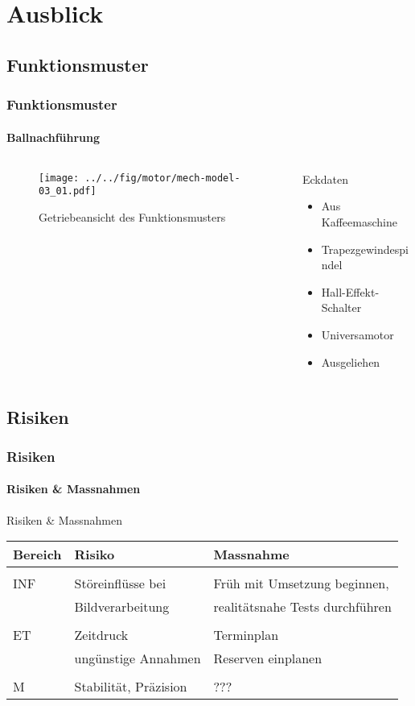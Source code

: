 \section{Ausblick}

\subsection{Funktionsmuster}
\begin{frame}
	\frametitle{Funktionsmuster\hfill{}\footnotesize \group}
	\framesubtitle{Ballnachführung}
	\begin{columns}
		\begin{column}{0.5\textwidth}
			\begin{figure}
				\texttt{[image: ../../fig/motor/mech-model-03\_01.pdf]}
				\caption{Getriebeansicht des Funktionsmusters}
			\end{figure}
		\end{column}
		\begin{column}{0.5\textwidth}
			\begin{block}{Eckdaten}
				\begin{itemize}
					\item Aus Kaffeemaschine
					\item Trapezgewindespindel
					\item Hall-Effekt-Schalter
					\item Universamotor
					\item Ausgeliehen
				\end{itemize}
			\end{block}
		\end{column}
	\end{columns}
\end{frame}

\subsection{Risiken}
\begin{frame}
	\frametitle{Risiken \hfill{} \footnotesize \group}
	\framesubtitle{Risiken \& Massnahmen}
	\begin{block}{Risiken \& Massnahmen}
		\begin{tabular}{l l l}
			Bereich
				& Risiko
				& Massnahme \\
			\hline
			& & \\
			INF	& Störeinflüsse bei 
				& Früh mit 
				  Umsetzung beginnen, \\
				& Bildverarbeitung
				& realitätsnahe Tests
				 durchführen \\
			& & \\
			ET	& Zeitdruck
				& Terminplan \\
				& ungünstige Annahmen
				& Reserven einplanen \\
			& & \\
			M	& Stabilität, Präzision
				& ??? \\
		\end{tabular}
	\end{block}
\end{frame}
